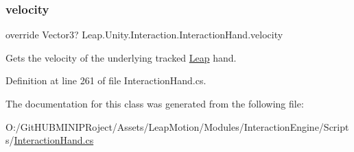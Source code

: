 \subsubsection{\texorpdfstring{velocity}{velocity}}
{\footnotesize\ttfamily override Vector3? Leap.\+Unity.\+Interaction.\+Interaction\+Hand.\+velocity\hspace{0.3cm}{\ttfamily [get]}}



Gets the velocity of the underlying tracked \mbox{\hyperlink{namespace_leap_1_1_unity_1_1_leap}{Leap}} hand. 



Definition at line 261 of file Interaction\+Hand.\+cs.



The documentation for this class was generated from the following file\+:\begin{DoxyCompactItemize}
\item 
O\+:/\+Git\+H\+U\+B\+M\+I\+N\+I\+P\+Roject/\+Assets/\+Leap\+Motion/\+Modules/\+Interaction\+Engine/\+Scripts/\mbox{\hyperlink{_interaction_hand_8cs}{Interaction\+Hand.\+cs}}\end{DoxyCompactItemize}
